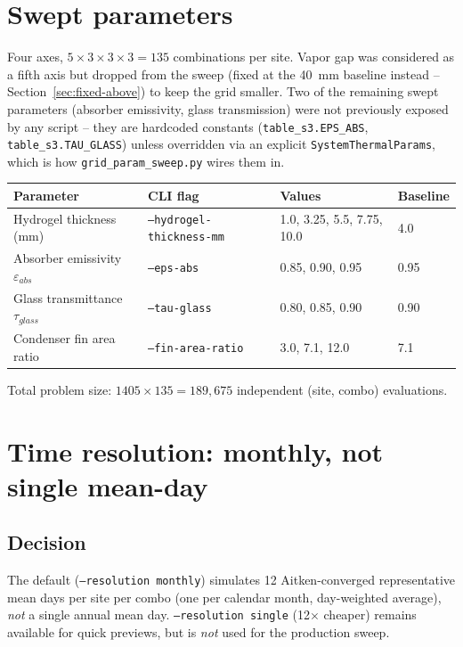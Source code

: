 \documentclass[11pt]{article}
\begin{document}
\section{Swept parameters}\label{sec:swept}

Four axes, $5\times3\times3\times3 = 135$ combinations per site. Vapor gap was considered as a
fifth axis but dropped from the sweep (fixed at the \SI{40}{\milli\meter} baseline instead --
Section~\ref{sec:fixed-above}) to keep the grid smaller. Two of the remaining swept parameters
(absorber emissivity, glass transmission) were not previously exposed by any script -- they are
hardcoded constants (\texttt{table\_s3.EPS\_ABS}, \texttt{table\_s3.TAU\_GLASS}) unless overridden
via an explicit \texttt{SystemThermalParams}, which is how \texttt{grid\_param\_sweep.py} wires
them in.

\begin{table}[h]
\centering
\small
\begin{tabular}{@{}llll@{}}
\toprule
\textbf{Parameter} & \textbf{CLI flag} & \textbf{Values} & \textbf{Baseline} \\
\midrule
Hydrogel thickness (mm) & \texttt{--hydrogel-thickness-mm} & 1.0, 3.25, 5.5, 7.75, 10.0 & 4.0 \\
Absorber emissivity $\varepsilon_{abs}$ & \texttt{--eps-abs} & 0.85, 0.90, 0.95 & 0.95 \\
Glass transmittance $\tau_{glass}$ & \texttt{--tau-glass} & 0.80, 0.85, 0.90 & 0.90 \\
Condenser fin area ratio & \texttt{--fin-area-ratio} & 3.0, 7.1, 12.0 & 7.1 \\
\bottomrule
\end{tabular}
\end{table}

Total problem size: $1405 \times 135 = 189{,}675$ independent (site, combo) evaluations.

\section{Time resolution: monthly, not single mean-day}\label{sec:resolution}

\subsection{Decision}
The default (\texttt{--resolution monthly}) simulates 12 Aitken-converged representative mean
days per site per combo (one per calendar month, day-weighted average), \emph{not} a single
annual mean day. \texttt{--resolution single} (12$\times$ cheaper) remains available for quick
previews, but is \emph{not} used for the production sweep.
\end{document}
